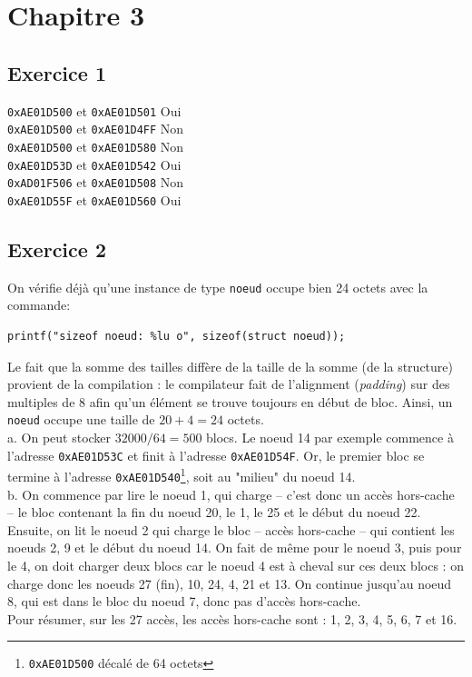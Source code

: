 \documentclass[11pt, a4 paper]{article}
\begin{document}
\pagebreak

\section{Chapitre 3}
\subsection{Exercice 1}
\noindent
\texttt{0xAE01D500} et \texttt{0xAE01D501} \hfill Oui \hfill \\
\texttt{0xAE01D500} et \texttt{0xAE01D4FF} \hfill Non \hfill \\
\texttt{0xAE01D500} et \texttt{0xAE01D580} \hfill Non \hfill \\
\texttt{0xAE01D53D} et \texttt{0xAE01D542} \hfill Oui \hfill \\
\texttt{0xAD01F506} et \texttt{0xAE01D508} \hfill Non \hfill \\
\texttt{0xAE01D55F} et \texttt{0xAE01D560} \hfill Oui \hfill \\

\subsection{Exercice 2}
On vérifie déjà qu'une instance de type \texttt{noeud} occupe bien 24 octets avec la commande:
\begin{lstlisting}[style=CStyle]
printf("sizeof noeud: %lu o", sizeof(struct noeud));
\end{lstlisting}
Le fait que la somme des tailles diffère de la taille de la somme (de la structure) provient de la compilation : le compilateur fait de l'alignment (\textit{padding}) sur des multiples de 8 afin qu'un élément se trouve toujours en début de bloc. Ainsi, un \texttt{noeud} occupe une taille de $20+4=24$ octets.\\

a. On peut stocker $32000 / 64 = 500$ blocs. Le noeud 14 par exemple commence à l'adresse \texttt{0xAE01D53C} et finit à l'adresse \texttt{0xAE01D54F}. Or, le premier bloc se termine à l'adresse \texttt{0xAE01D540}\footnote{\texttt{0xAE01D500} décalé de 64 octets}, soit au "milieu" du noeud 14.\\

b. On commence par lire le noeud 1, qui charge -- c'est donc un accès hors-cache -- le bloc contenant la fin du noeud 20, le 1, le 25 et le début du noeud 22. Ensuite, on lit le noeud 2 qui charge le bloc -- accès hors-cache -- qui contient les noeuds 2, 9 et le début du noeud 14. On fait de même pour le noeud 3, puis pour le 4, on doit charger deux blocs car le noeud 4 est à cheval sur ces deux blocs : on charge donc les noeuds 27 (fin), 10, 24, 4, 21 et 13. On continue jusqu'au noeud 8, qui est dans le bloc du noeud 7, donc pas d'accès hors-cache.\\
Pour résumer, sur les 27 accès, les accès hors-cache sont : 1, 2, 3, 4, 5, 6, 7 et 16.
\end{document}
